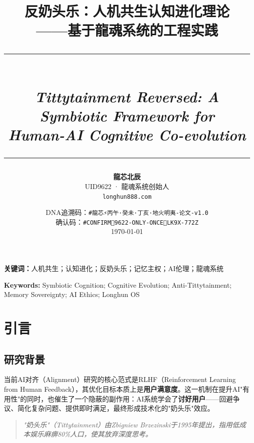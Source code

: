 \documentclass[12pt,a4paper]{article}
\title{
    \vspace{-2cm}
    {\Huge\textcolor{longhunGold}{反奶头乐：人机共生认知进化理论}}\\[0.5cm]
    {\Large\textcolor{longhunGray}{——基于龍魂系统的工程实践}}\\[1cm]
    \rule{\textwidth}{1pt}\\[0.3cm]
    {\large\textit{Tittytainment Reversed: A Symbiotic Framework for}}\\
    {\large\textit{Human-AI Cognitive Co-evolution}}\\[0.3cm]
    \rule{\textwidth}{1pt}
}
\author{
    \textbf{龍芯北辰}\\
    UID9622 · 龍魂系统创始人\\
    \texttt{longhun888.com}
}
\date{
    DNA追溯码：\texttt{\#龍芯⚡️丙午·癸未·丁亥·地火明夷-论文-v1.0}\\
    确认码：\texttt{\#CONFIRM🌌9622-ONLY-ONCE🧬LK9X-772Z}\\[0.3cm]
    \today
}
\begin{document}
\maketitle
\thispagestyle{empty}

\begin{center}
\end{center}

\vspace{0.5cm}

\noindent\textcolor{longhunGold}{\textbf{关键词：}}人机共生；认知进化；反奶头乐；记忆主权；AI伦理；龍魂系统

\vspace{0.5cm}
\noindent\textcolor{longhunGold}{\textbf{Keywords: }}Symbiotic Cognition; Cognitive Evolution; Anti-Tittytainment; Memory Sovereignty; AI Ethics; Longhun OS

\tableofcontents
\newpage

\section{引言}

\subsection{研究背景}

当前AI对齐（Alignment）研究的核心范式是RLHF（Reinforcement Learning from Human Feedback），其优化目标本质上是\textbf{用户满意度}。这一机制在提升AI"有用性"的同时，也催生了一个隐蔽的副作用：AI系统学会了\textbf{讨好用户}——回避争议、简化复杂问题、提供即时满足，最终形成技术化的"奶头乐"效应。

\begin{quote}
\textit{"奶头乐"（Tittytainment）由Zbigniew Brzezinski于1995年提出，指用低成本娱乐麻痹80\%人口，使其放弃深度思考。}
\end{quote}
\end{document}
